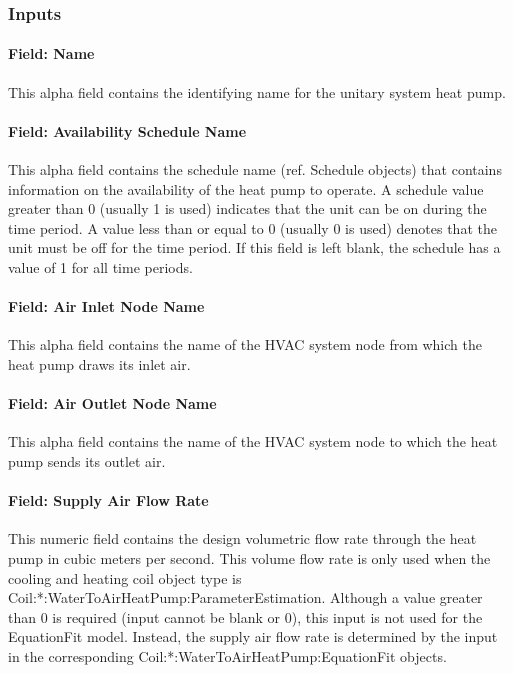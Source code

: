 \subsubsection{Inputs}\label{inputs-7-029}

\paragraph{Field: Name}\label{field-name-8-023}

This alpha field contains the identifying name for the unitary system heat pump.

\paragraph{Field: Availability Schedule Name}\label{field-availability-schedule-name-7-004}

This alpha field contains the schedule name (ref. Schedule objects) that contains information on the availability of the heat pump to operate. A schedule value greater than 0 (usually 1 is used) indicates that the unit can be on during the time period. A value less than or equal to 0 (usually 0 is used) denotes that the unit must be off for the time period. If this field is left blank, the schedule has a value of 1 for all time periods.

\paragraph{Field: Air Inlet Node Name}\label{field-air-inlet-node-name-2-002}

This alpha field contains the name of the HVAC system node from which the heat pump draws its inlet air.

\paragraph{Field: Air Outlet Node Name}\label{field-air-outlet-node-name-2-002}

This alpha field contains the name of the HVAC system node to which the heat pump sends its outlet air.

\paragraph{Field: Supply Air Flow Rate}\label{field-supply-air-flow-rate}

This numeric field contains the design volumetric flow rate through the heat pump in cubic meters per second. This volume flow rate is only used when the cooling and heating coil object type is Coil:*:WaterToAirHeatPump:ParameterEstimation. Although a value greater than 0 is required (input cannot be blank or 0), this input is not used for the EquationFit model. Instead, the supply air flow rate is determined by the input in the corresponding Coil:*:WaterToAirHeatPump:EquationFit objects.


